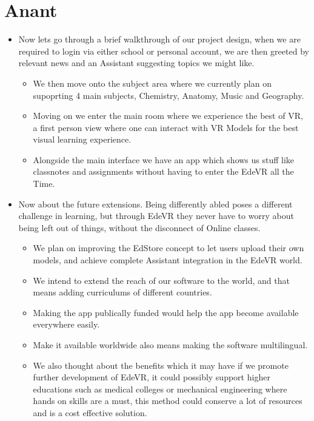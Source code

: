 \documentclass[11pt]{article}
\begin{document}
\section{Anant}
\label{sec:orgeac6aca}
\begin{itemize}
\item Now lets go through a brief walkthrough of our project design, when we are required to login via either school or personal account, we are then greeted by relevant news and an Assistant suggesting topics we might like.
\begin{itemize}
\item We then move onto the subject area where we currently plan on supoprting 4 main subjects, Chemistry, Anatomy, Music and Geography.
\item Moving on we enter the main room where we experience the best of VR, a first person view where one can interact with VR Models for the best visual learning experience.
\item Alongside the main interface we have an app which shows us stuff like classnotes and assignments without having to enter the EdeVR all the Time.
\end{itemize}
\item Now about the future extensions. Being differently abled poses a different challenge in learning, but through EdeVR they never have to worry about being left out of things, without the disconnect of Online classes.
\begin{itemize}
\item We plan on improving the EdStore concept to let users upload their own models, and achieve complete Assistant integration in the EdeVR world.
\item We intend to extend the reach of our software to the world, and that means adding curriculums of different countries.
\item Making the app publically funded would help the app become available everywhere easily.
\item Make it available worldwide also means making the software multilingual.
\item We also thought about the benefits which it may have if we promote further development of EdeVR, it could possibly support higher educations such as medical colleges or mechanical engineering where hands on skills are a must, this method could conserve a lot of resources and is a cost effective solution.
\end{itemize}
\end{itemize}
\end{document}
